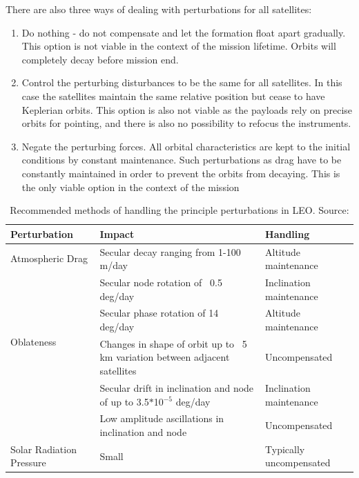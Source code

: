There are also three ways of dealing with perturbations for all satellites:

\begin{enumerate}
	\item Do nothing - do not compensate and let the formation float apart gradually. This option is not viable in the context of the mission lifetime. Orbits will completely decay before mission end.
	\item Control the perturbing disturbances to be the same for all satellites. In this case the satellites maintain the same relative position but cease to have Keplerian orbits. This option is also not viable as the payloads rely on precise orbits for pointing, and there is also no possibility to refocus the instruments.
	\item Negate the perturbing forces. All orbital characteristics are kept to the initial conditions by constant maintenance. Such perturbations as drag have to be constantly maintained in order to prevent the orbits from decaying. This is the only viable option in the context of the mission
\end{enumerate}

\begin{table}
	\centering
		\begin{tabular}{p{5cm}|p{5cm}|p{5cm}}
	\textbf{Perturbation} & \textbf{Impact} & \textbf{Handling} \\
		\hline \hline
		Atmospheric Drag & Secular decay ranging from 1-100 m/day & Altitude maintenance \\ \hline
		\multirow{4}{*}{Oblateness} & Secular node rotation of ~0.5 deg/day & Inclination maintenance \\ \cline{2-3}
		 & Secular phase rotation of 14 deg/day & Altitude maintenance \\ \cline{2-3}
		 & Changes in shape of orbit up to ~5 km variation between adjacent satellites & Uncompensated \\
    \hline
		\multirow{2}{*}{Solar/Lunar} & Secular drift in inclination and node of up to 3.5$*$10$^{-5}$ deg/day & Inclination maintenance\\ \cline{2-3}
		 & Low amplitude ascillations in inclination and node & Uncompensated \\ \hline
		Solar Radiation Pressure & Small & Typically uncompensated
	\end{tabular}
	\caption{Recommended methods of handling the principle perturbations in LEO. Source: \cite{constDesign}}
	\label{table:station}
\end{table}


